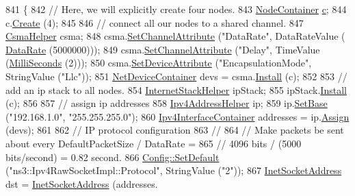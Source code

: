 \begin{DoxyCode}
841 \{
842   \textcolor{comment}{// Here, we will explicitly create four nodes.}
843   \hyperlink{classns3_1_1NodeContainer}{NodeContainer} \hyperlink{lte_2model_2fading-traces_2fading__trace__generator_8m_ae0323a9039add2978bf5b49550572c7c}{c};
844   c.\hyperlink{classns3_1_1NodeContainer_a787f059e2813e8b951cc6914d11dfe69}{Create} (4);
845 
846   \textcolor{comment}{// connect all our nodes to a shared channel.}
847   \hyperlink{classns3_1_1CsmaHelper}{CsmaHelper} csma;
848   csma.\hyperlink{classns3_1_1CsmaHelper_a886d900b2fe44433e0b81752dea7e7f1}{SetChannelAttribute} (\textcolor{stringliteral}{"DataRate"}, DataRateValue (
      \hyperlink{classns3_1_1DataRate}{DataRate} (5000000)));
849   csma.\hyperlink{classns3_1_1CsmaHelper_a886d900b2fe44433e0b81752dea7e7f1}{SetChannelAttribute} (\textcolor{stringliteral}{"Delay"}, TimeValue (\hyperlink{group__timecivil_gaf26127cf4571146b83a92ee18679c7a9}{MilliSeconds} (2)));
850   csma.\hyperlink{classns3_1_1CsmaHelper_a741c31b2526e3570cc62c9d7d9667ca9}{SetDeviceAttribute} (\textcolor{stringliteral}{"EncapsulationMode"}, StringValue (\textcolor{stringliteral}{"Llc"}));
851   \hyperlink{classns3_1_1NetDeviceContainer}{NetDeviceContainer} devs = csma.\hyperlink{classns3_1_1CsmaHelper_af79a91372595230b0817200270ab84e7}{Install} (c);
852 
853   \textcolor{comment}{// add an ip stack to all nodes.}
854   \hyperlink{classns3_1_1InternetStackHelper}{InternetStackHelper} ipStack;
855   ipStack.\hyperlink{classns3_1_1InternetStackHelper_a6645b412f31283d2d9bc3d8a95cebbc0}{Install} (c);
856 
857   \textcolor{comment}{// assign ip addresses}
858   \hyperlink{classns3_1_1Ipv4AddressHelper}{Ipv4AddressHelper} ip;
859   ip.\hyperlink{classns3_1_1Ipv4AddressHelper_acf7b16dd25bac67e00f5e25f90a9a035}{SetBase} (\textcolor{stringliteral}{"192.168.1.0"}, \textcolor{stringliteral}{"255.255.255.0"});
860   \hyperlink{classns3_1_1Ipv4InterfaceContainer}{Ipv4InterfaceContainer} addresses = ip.\hyperlink{classns3_1_1Ipv4AddressHelper_af8e7f4a1a7e74c00014a1eac445a27af}{Assign} (devs);
861 
862   \textcolor{comment}{// IP protocol configuration}
863   \textcolor{comment}{//}
864   \textcolor{comment}{// Make packets be sent about every DefaultPacketSize / DataRate = }
865   \textcolor{comment}{// 4096 bits / (5000 bits/second) = 0.82 second.}
866   \hyperlink{group__config_ga2e7882df849d8ba4aaad31c934c40c06}{Config::SetDefault} (\textcolor{stringliteral}{"ns3::Ipv4RawSocketImpl::Protocol"}, StringValue (\textcolor{stringliteral}{"2"}));
867   \hyperlink{classns3_1_1InetSocketAddress}{InetSocketAddress} dst = \hyperlink{classns3_1_1InetSocketAddress}{InetSocketAddress} (addresses.

\end{DoxyCode}

